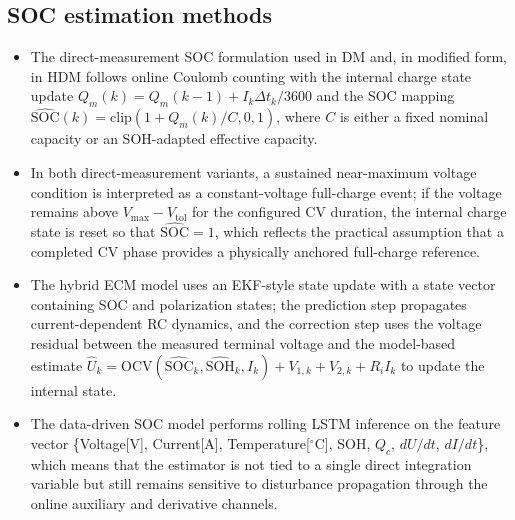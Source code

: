 \documentclass[review]{elsarticle}
\begin{document}
\subsection{SOC estimation methods}
\begin{itemize}[leftmargin=*]
    \item The direct-measurement SOC formulation used in DM and, in modified form, in HDM follows online Coulomb counting with the internal charge state update $Q_m(k)=Q_m(k-1)+I_k \Delta t_k / 3600$ and the SOC mapping $\widehat{\mathrm{SOC}}(k)=\mathrm{clip}\!\left(1+Q_m(k)/C,0,1\right)$, where $C$ is either a fixed nominal capacity or an SOH-adapted effective capacity.
    \item In both direct-measurement variants, a sustained near-maximum voltage condition is interpreted as a constant-voltage full-charge event; if the voltage remains above $V_{\max}-V_{\mathrm{tol}}$ for the configured CV duration, the internal charge state is reset so that $\widehat{\mathrm{SOC}}=1$, which reflects the practical assumption that a completed CV phase provides a physically anchored full-charge reference.
    \item The hybrid ECM model uses an EKF-style state update with a state vector containing SOC and polarization states; the prediction step propagates current-dependent RC dynamics, and the correction step uses the voltage residual between the measured terminal voltage and the model-based estimate $\widehat{U}_k = \mathrm{OCV}(\widehat{\mathrm{SOC}}_k,\widehat{\mathrm{SOH}}_k,I_k) + V_{1,k} + V_{2,k} + R_i I_k$ to update the internal state.
    \item The data-driven SOC model performs rolling LSTM inference on the feature vector \{Voltage[V], Current[A], Temperature[$^\circ$C], SOH, $Q_c$, $dU/dt$, $dI/dt$\}, which means that the estimator is not tied to a single direct integration variable but still remains sensitive to disturbance propagation through the online auxiliary and derivative channels.
\end{itemize}
\end{document}
